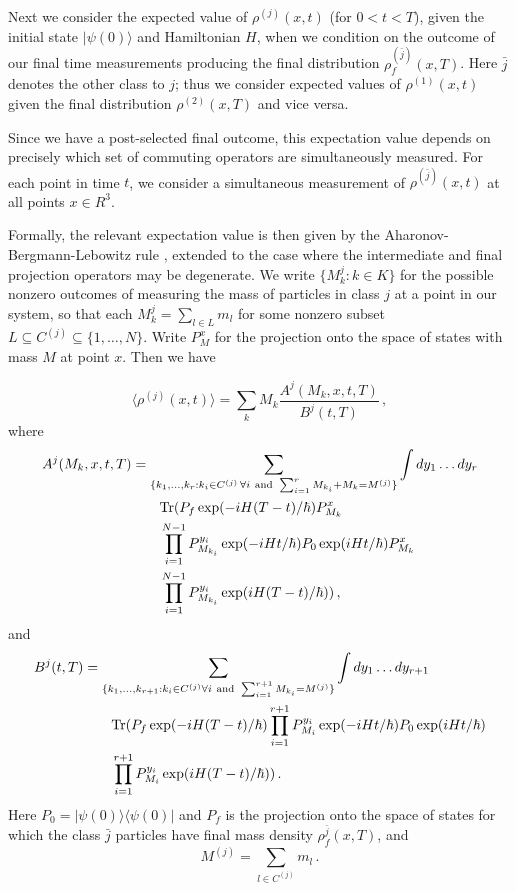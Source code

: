 \documentclass[12pt,aps]{revtex4}
\def\bra#1{\langle #1 |}
\def\ket#1{| #1\rangle}
\def\Tr{{\rm Tr}}
\begin{document}
Next we consider the expected value of $\rho^{(j)}(x,t)$ (for $0 < t < T$), 
given the initial state $\ket{\psi(0)}$ and Hamiltonian $H$, 
when we condition on the outcome of our final time measurements
producing the final distribution $\rho^{(\bar{j})}_f (x,T)$. 
Here $\bar{j}$ denotes the other class to $j$; thus we consider 
expected values of $\rho^{(1)} (x,t)$ given the final distribution
$\rho^{(2)} (x, T)$ and vice versa.  

Since we have a post-selected final outcome,
this expectation value depends on precisely which set of 
commuting operators are simultaneously measured. 
For each point in time $t$, 
we consider a simultaneous measurement of $\rho^{(\bar{j})}(x,t)$ at all
points $x \in R^3$. 

Formally, the relevant expectation value is then
given by the Aharonov-Bergmann-Lebowitz
rule \cite{aharonov1964time}, extended to the case where the
intermediate and final projection operators may be degenerate.
We write $\{ M_k^j : k \in K \}$ for the possible nonzero outcomes of measuring
the mass of particles in class $j$
at a point in our system, so that each $M_k^j = \sum_{l \in L}
m_l $ for some nonzero subset $L \subseteq C^{(j)} \subseteq
\{ 1 , \ldots , N \}$. 
Write $P_M^x$ for the projection onto the space of states with
mass $M$ at point $x$.   
Then we have 

\begin{equation}
\langle \rho^{(j)} (x,t) \rangle =  \sum_k M_k 
 \frac{ A^j (M_k , x, t, T)}{B^j (t,T)} \, , 
\end{equation}
where 
\begin{align*}
A^j (M_k, x, t, T) &=
\sum_{\{ k_1 , \ldots , k_{r} : k_i \in C^{(j)} \, \forall i {\rm~and~}
\sum_{i=1}^{r} M_{k_i} + M_k =
 M^{(j)} \} } 
\int dy_1 \ldots dy_{r}\\
  &\qquad\Tr ( P_f \exp ( - i H (T-t) /
\hbar ) P_{M_k}^x \\
& \qquad \prod_{i=1}^{N-1} P_{M_{k_i}}^{y_i}
 \exp ( - i H t / \hbar ) P_0 \exp (  i H t /
\hbar ) P_{M_k}^x \\
&\qquad \prod_{i=1}^{N-1} P_{M_{k_i}}^{y_i} \exp (  i H (T-t) / \hbar )  )
\, , \nonumber 
\end{align*}
and
\begin{align*}
B^j (t,T) &= \sum_{\{ k_1 , \ldots , k_{r+1} : k_i \in C^{(j)} \forall i
  {\rm~and~}
\sum_{i=1}^{r+1} M_{k_i} =
 M^{(j)} \} }
\int dy_1 \ldots dy_{r+1} \\
& \qquad \Tr ( P_f \exp ( - i H (T-t) /
\hbar )  \prod_{i=1}^{r+1}  P_{M_i}^{y_i}  \exp ( - i H t / \hbar ) P_0 
\exp (  i H t / \hbar ) \\
& \qquad \prod_{i=1}^{r+1}  P_{M_i}^{y_i}  \exp (  i H (T-t) /
\hbar ) ) \, .  
\end{align*}
Here $P_0 = \ket{\psi (0 ) }\bra{ \psi(0)}$ and 
$P_{f}$ is the projection onto the space of states for which
the class $\bar{j}$ particles have final 
mass density $\rho_f^{\bar{j}} (x,T)$, and
$$
M^{(j)} = \sum_{l \in C^{(j)}} m_l \, .
$$
\end{document}
